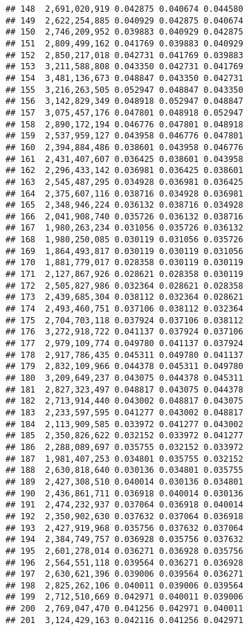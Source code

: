 \documentclass[]{article}
\begin{document}
\begin{verbatim}
## 148  2,691,020,919 0.042875 0.040674 0.044580
## 149  2,622,254,885 0.040929 0.042875 0.040674
## 150  2,746,209,952 0.039883 0.040929 0.042875
## 151  2,809,499,162 0.041769 0.039883 0.040929
## 152  2,850,217,018 0.042731 0.041769 0.039883
## 153  3,211,588,808 0.043350 0.042731 0.041769
## 154  3,481,136,673 0.048847 0.043350 0.042731
## 155  3,216,263,505 0.052947 0.048847 0.043350
## 156  3,142,829,349 0.048918 0.052947 0.048847
## 157  3,075,457,176 0.047801 0.048918 0.052947
## 158  2,890,172,194 0.046776 0.047801 0.048918
## 159  2,537,959,127 0.043958 0.046776 0.047801
## 160  2,394,884,486 0.038601 0.043958 0.046776
## 161  2,431,407,607 0.036425 0.038601 0.043958
## 162  2,296,433,142 0.036981 0.036425 0.038601
## 163  2,545,487,295 0.034928 0.036981 0.036425
## 164  2,375,607,116 0.038716 0.034928 0.036981
## 165  2,348,946,224 0.036132 0.038716 0.034928
## 166  2,041,908,740 0.035726 0.036132 0.038716
## 167  1,980,263,234 0.031056 0.035726 0.036132
## 168  1,980,250,085 0.030119 0.031056 0.035726
## 169  1,864,493,817 0.030119 0.030119 0.031056
## 170  1,881,779,017 0.028358 0.030119 0.030119
## 171  2,127,867,926 0.028621 0.028358 0.030119
## 172  2,505,827,986 0.032364 0.028621 0.028358
## 173  2,439,685,304 0.038112 0.032364 0.028621
## 174  2,493,460,751 0.037106 0.038112 0.032364
## 175  2,704,703,118 0.037924 0.037106 0.038112
## 176  3,272,918,722 0.041137 0.037924 0.037106
## 177  2,979,109,774 0.049780 0.041137 0.037924
## 178  2,917,786,435 0.045311 0.049780 0.041137
## 179  2,832,109,966 0.044378 0.045311 0.049780
## 180  3,209,649,237 0.043075 0.044378 0.045311
## 181  2,827,323,497 0.048817 0.043075 0.044378
## 182  2,713,914,440 0.043002 0.048817 0.043075
## 183  2,233,597,595 0.041277 0.043002 0.048817
## 184  2,113,909,585 0.033972 0.041277 0.043002
## 185  2,350,826,622 0.032152 0.033972 0.041277
## 186  2,288,089,697 0.035755 0.032152 0.033972
## 187  1,981,407,253 0.034801 0.035755 0.032152
## 188  2,630,818,640 0.030136 0.034801 0.035755
## 189  2,427,308,510 0.040014 0.030136 0.034801
## 190  2,436,861,711 0.036918 0.040014 0.030136
## 191  2,474,232,937 0.037064 0.036918 0.040014
## 192  2,350,902,630 0.037632 0.037064 0.036918
## 193  2,427,919,968 0.035756 0.037632 0.037064
## 194  2,384,749,757 0.036928 0.035756 0.037632
## 195  2,601,278,014 0.036271 0.036928 0.035756
## 196  2,564,551,118 0.039564 0.036271 0.036928
## 197  2,630,621,396 0.039006 0.039564 0.036271
## 198  2,825,262,106 0.040011 0.039006 0.039564
## 199  2,712,510,669 0.042971 0.040011 0.039006
## 200  2,769,047,470 0.041256 0.042971 0.040011
## 201  3,124,429,163 0.042116 0.041256 0.042971

\end{verbatim}
\end{document}
